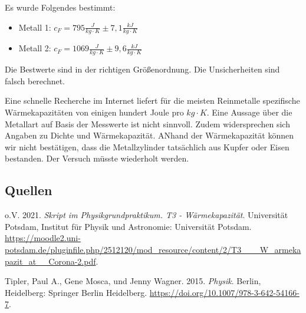 \documentclass[
  9pt,
]{article}
\newlength{\cslhangindent}
\newlength{\cslentryspacingunit} %
\newenvironment{CSLReferences}[2] %
 {%
  \setlength{\parindent}{0pt}
  \ifodd #1
  \let\oldpar\par
  \def\par{\hangindent=\cslhangindent\oldpar}
  \fi
  \setlength{\parskip}{#2\cslentryspacingunit}
 }%
 {}
\begin{document}
Es wurde Folgendes bestimmt:

\begin{itemize}
  \item Metall 1: $c_F = 795\frac{J}{kg\cdot K}\pm 7,1\frac{kJ}{kg\cdot K}$
  \item Metall 2: $c_F = 1069\frac{J}{kg\cdot K}\pm 9,6\frac{kJ}{kg\cdot K}$
\end{itemize}

Die Bestwerte sind in der richtigen Größenordnung. Die Unsicherheiten
sind falsch berechnet.

Eine schnelle Recherche im Internet liefert für die meisten Reinmetalle
spezifische Wärmekapazitäten von einigen hundert Joule pro
\(kg\cdot K\). Eine Aussage über die Metallart auf Basis der Messwerte
ist nicht sinnvoll. Zudem widersprechen sich Angaben zu Dichte und
Wärmekapazität. ANhand der Wärmekapazität können wir nicht bestätigen,
dass die Metallzylinder tatsächlich aus Kupfer oder Eisen bestanden. Der
Versuch müsste wiederholt werden.

\hypertarget{quellen}{%
\subsection*{Quellen}\label{quellen}}

\hypertarget{refs}{}
\begin{CSLReferences}{1}{0}
\leavevmode{}%
o.V. 2021. \emph{Skript im Physikgrundpraktikum. T3 - Wärmekapazität}.
Universität Potsdam, Institut für Physik und Astronomie: {Universität
Potsdam}.
\url{https://moodle2.uni-potsdam.de/pluginfile.php/2512120/mod_resource/content/2/T3___W_armekapazit_at__Corona-2.pdf}.

\leavevmode{}%
Tipler, Paul A., Gene Mosca, und Jenny Wagner. 2015. \emph{Physik}.
Berlin, Heidelberg: {Springer Berlin Heidelberg}.
\url{https://doi.org/10.1007/978-3-642-54166-7}.

\end{CSLReferences}
\end{document}
